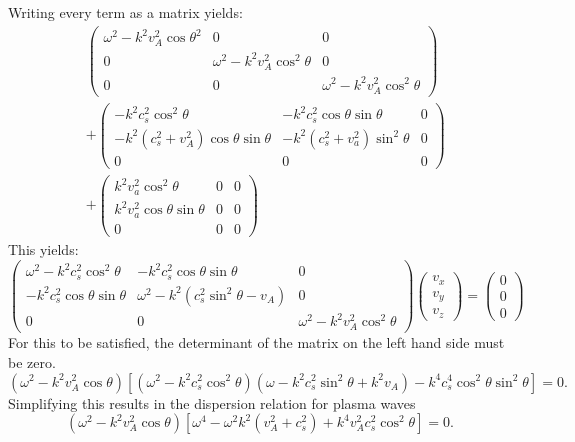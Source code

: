 \documentclass{article}
\begin{document}
Writing every term as a matrix yields:
\begin{align*}
	&\begin{pmatrix}
		\omega^2  - k^2 v_A^2 \cos\theta^2    & 0 & 0 \\
		0 & \omega^2 - k^2v_A^2\cos^2\theta & 0 \\
		0 & 0 & \omega^2 - k^2v_A^2\cos^2\theta
	\end{pmatrix} \\
	 & + \begin{pmatrix} 
		 -k^2 c_s^2 \cos^2 \theta & - k^2 c_s^2 \cos\theta \sin \theta  & 0 \\
		 -k^2(c_s^2 + v_A^2) \cos\theta \sin \theta & -k^2(c_s^2 + v_a^2) \sin^2\theta & 0 \\
		 0 & 0 & 0
	 \end{pmatrix} \\  
	 &  + \begin{pmatrix} 
		 k^2 v_a^2 \cos^2\theta & 0 & 0  \\
		 k^2 v_a^2 \cos \theta \sin \theta & 0 & 0 \\
		 0 & 0 & 0
	 \end{pmatrix} 
\end{align*}
This yields:
\begin{equation}\label{eq:MHD_linear_matrix}
	\begin{pmatrix}
		\omega^2  - k^2 c_s^2 \cos^2\theta   & -k^2c_s^2\cos\theta \sin \theta & 0 \\
		-k^2 c_s^2 \cos\theta \sin \theta & \omega^2 - k^2(c_s^2\sin^2\theta - v_A)   & 0 \\
		0 & 0 & \omega^2 - k^2v_A^2\cos^2\theta
	\end{pmatrix} 
	\begin{pmatrix} v_x \\ v_y \\ v_z \end{pmatrix} 
	 = \begin{pmatrix} 0 \\ 0 \\0  \end{pmatrix} 
\end{equation}
For this to be satisfied, the determinant of the matrix on the left hand side must be zero. 
\[
	(\omega^2 - k^2v_A^2 \cos \theta)\left[ (\omega^2-k^2c_s^2 \cos^2 \theta)(\omega - k^2c_s^2 \sin^2 \theta + k^2 v_A) - k^4c_s^{4}\cos^2\theta \sin^2\theta   \right] = 0
.\] 
Simplifying this results in the dispersion relation for plasma waves
\begin{equation}\label{eq:disperion}
	(\omega^2 - k^2 v_A^2 \cos \theta)\left[ \omega^{4} - \omega^2k^2(v_A^2 + c_s^2) + k^{4}v_A^2c_s^2\cos^2\theta \right]  = 0
.\end{equation} 
\end{document}
